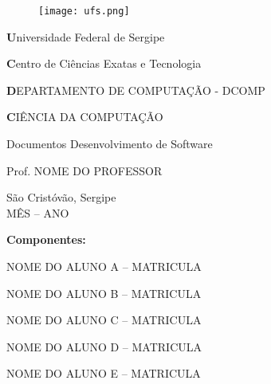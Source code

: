 \begin{titlepage}

\newcommand{\universidade}{Universidade Federal de Sergipe}
\newcommand{\centro}{Centro de Ciências Exatas e Tecnologia}
\newcommand{\departamento}{DEPARTAMENTO DE COMPUTAÇÃO - DCOMP}
\newcommand{\curso}{CIÊNCIA DA COMPUTAÇÃO}

\newcommand{\titulo}{Documentos Desenvolvimento de Software}

\newcommand{\professor}{Prof. NOME DO PROFESSOR}

\begin{center}
\begin{figure}[t]
	\centering
	\texttt{[image: ufs.png]}
\end{figure}
{\large \textbf \universidade}
\par
{\large \textbf \centro}
\par
{\large \textbf \departamento}
\par
{\large \textbf \curso}
\par
\vspace{60pt}

{\large \titulo}
\par
\vspace{60pt}

{\large \professor}
\par
\vfill

{\large São Cristóvão, Sergipe}\\
{\large MÊS -- ANO}
\end{center}
\end{titlepage}



\newcommand{\alunoA}{NOME DO ALUNO A -- MATRICULA}
\newcommand{\alunoB}{NOME DO ALUNO B -- MATRICULA}
\newcommand{\alunoC}{NOME DO ALUNO C -- MATRICULA}
\newcommand{\alunoD}{NOME DO ALUNO D -- MATRICULA}
\newcommand{\alunoE}{NOME DO ALUNO E -- MATRICULA}

\setcounter{page}{2}

\begin{center}
{\large \textbf {Componentes:}}
\par
\vspace{12pt}
{\normalsize \alunoA}
\par
{\normalsize \alunoB}
\par
{\normalsize \alunoC}
\par
{\normalsize \alunoD}
\par
{\normalsize \alunoE}
\par
\end{center}
\clearpage



\renewcommand{\contentsname}{Conteúdo}
{
	\hypersetup{linkcolor=black}
	\tableofcontents
}